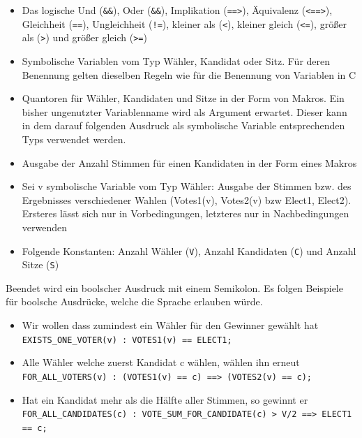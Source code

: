 \documentclass[a4paper]{scrreprt}
\begin{document}
\begin{itemize}
\item Das logische Und (\verb!&&!), Oder (\verb!&&!), Implikation (\verb!==>!), Äquivalenz (\verb!<==>!), Gleichheit (\verb!==!), Ungleichheit (\texttt{!=}), kleiner als (\texttt{<}), kleiner gleich (\texttt{<=}), größer als (\texttt{>}) und größer gleich (\texttt{>=})
\item Symbolische Variablen vom Typ Wähler, Kandidat oder Sitz. Für deren Benennung gelten dieselben Regeln wie für die Benennung von Variablen in C
\item Quantoren für Wähler, Kandidaten und Sitze in der Form von \gls{Makros}. Ein bisher ungenutzter Variablenname wird als Argument erwartet. Dieser kann in dem darauf folgenden Ausdruck als symbolische Variable entsprechenden Typs verwendet werden.
\item Ausgabe der Anzahl Stimmen für einen Kandidaten in der Form eines Makros
\item Sei v symbolische Variable vom Typ Wähler:  Ausgabe der Stimmen bzw. des Ergebnisses verschiedener Wahlen (Votes1(v), Votes2(v) bzw Elect1, Elect2). Ersteres lässt sich nur in Vorbedingungen, letzteres nur in Nachbedingungen verwenden 
\item Folgende Konstanten: Anzahl Wähler (\verb!V!), Anzahl Kandidaten (\verb!C!) und Anzahl Sitze (\verb!S!)
\end{itemize}
Beendet wird ein boolscher Ausdruck mit einem Semikolon. Es folgen Beispiele für boolsche Ausdrücke, welche die Sprache erlauben würde.

\begin{itemize}
\item Wir wollen dass zumindest ein Wähler für den Gewinner gewählt hat \\
\verb!EXISTS_ONE_VOTER(v) : VOTES1(v) == ELECT1;!
\item Alle Wähler welche zuerst Kandidat c wählen, wählen ihn erneut\\
\verb!FOR_ALL_VOTERS(v) : (VOTES1(v) == c) ==> (VOTES2(v) == c);!
\item Hat ein Kandidat mehr als die Hälfte aller Stimmen, so gewinnt er \\
\verb!FOR_ALL_CANDIDATES(c) : VOTE_SUM_FOR_CANDIDATE(c) > V/2 ==> ELECT1 == c;!
\end{itemize}
\end{document}
